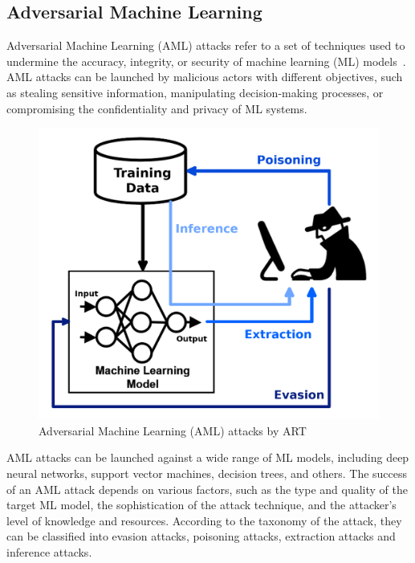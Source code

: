 \subsection{Adversarial Machine Learning}\label{subsec:adversarial-machine-learning}

Adversarial Machine Learning (AML) attacks refer to a set of techniques used to undermine the accuracy, integrity, or
security of machine learning (ML) models~\cite{huang2011adversarial}.
AML attacks can be launched by malicious actors with different objectives, such as stealing sensitive information,
manipulating decision-making processes, or compromising the confidentiality and privacy of ML systems.

\begin{figure}
\centering
\includegraphics[width=0.9\columnwidth]{AML}
\caption{Adversarial Machine Learning (AML) attacks by ART~\cite{art2018}}
\label{fig:aml}
\end{figure}

AML attacks can be launched against a wide range of ML models, including deep neural networks, support vector machines,
decision trees, and others.
The success of an AML attack depends on various factors, such as the type and quality of the target ML model, the
sophistication of the attack technique, and the attacker's level of knowledge and resources.
According to the taxonomy of the attack, they can be classified into evasion attacks, poisoning attacks, extraction
attacks and inference attacks\cite{de2020overview}.

